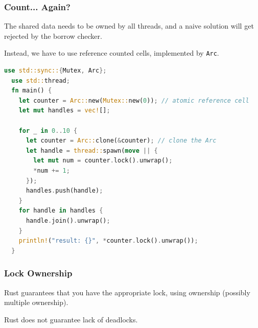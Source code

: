 \begin{frame}[fragile]
\frametitle{Count... Again?}

 The shared data needs to be owned by all threads, and a naive solution
will get rejected by the borrow checker. 

Instead, we have to use \alert{reference counted
  cells}, implemented by {\tt Arc}.
\begin{lstlisting}[language=Rust]
  use std::sync::{Mutex, Arc};
  use std::thread;
  fn main() {
    let counter = Arc::new(Mutex::new(0)); // atomic reference cell
    let mut handles = vec![];

    for _ in 0..10 {
      let counter = Arc::clone(&counter); // clone the Arc
      let handle = thread::spawn(move || {
        let mut num = counter.lock().unwrap();
        *num += 1;
      });
      handles.push(handle);
    }
    for handle in handles {
      handle.join().unwrap();
    }
    println!("result: {}", *counter.lock().unwrap());
  }
\end{lstlisting}

\end{frame}


\begin{frame}
\frametitle{Lock Ownership}

Rust guarantees that you have the appropriate lock, using ownership (possibly multiple ownership).


Rust does not guarantee lack of deadlocks.


\end{frame}






